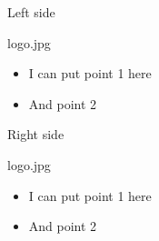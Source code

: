 \documentclass{beamer}
\begin{document}

\begin{slide}{Left side}
    \begin{pictureleft}{logo.jpg}
        \begin{itemize}
            \item I can put point 1 here
            \item And point 2
        \end{itemize}
    \end{pictureleft}
\end{slide}

\begin{slide}{Right side}
    \begin{pictureright}{logo.jpg}
        \begin{itemize}
            \item I can put point 1 here
            \item And point 2
        \end{itemize}
    \end{pictureright}
\end{slide}



\end{document}
